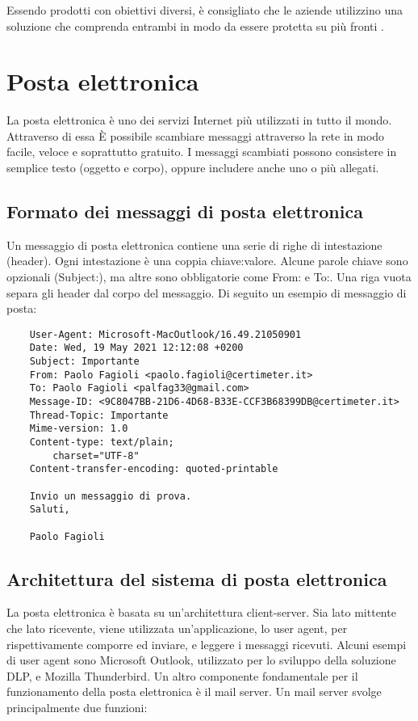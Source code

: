     \subsubsection*{}     
    Essendo prodotti con obiettivi diversi, è consigliato che le aziende utilizzino una soluzione che comprenda entrambi
    in modo da essere protetta su più fronti \cite{DLP5}.


\pagebreak
\section{Posta elettronica}
La posta elettronica è uno dei servizi Internet più utilizzati in tutto il mondo\cite{posta}. Attraverso di essa
È possibile scambiare messaggi attraverso la rete in modo facile, veloce e soprattutto gratuito. 
I messaggi scambiati possono consistere in semplice testo (oggetto e corpo), 
oppure includere anche uno o più allegati.

\subsection{Formato dei messaggi di posta elettronica}
Un messaggio di posta elettronica contiene una serie di righe di intestazione (header).
Ogni intestazione è una coppia chiave:valore. Alcune parole chiave sono opzionali (Subject:), 
ma altre sono obbligatorie come From: e To:. Una riga vuota separa gli header dal corpo del messaggio.
Di seguito un esempio di messaggio di posta:

\begin{verbatim}
    User-Agent: Microsoft-MacOutlook/16.49.21050901
    Date: Wed, 19 May 2021 12:12:08 +0200
    Subject: Importante
    From: Paolo Fagioli <paolo.fagioli@certimeter.it>
    To: Paolo Fagioli <palfag33@gmail.com>
    Message-ID: <9C8047BB-21D6-4D68-B33E-CCF3B68399DB@certimeter.it>
    Thread-Topic: Importante
    Mime-version: 1.0
    Content-type: text/plain;
        charset="UTF-8"
    Content-transfer-encoding: quoted-printable

    Invio un messaggio di prova.
    Saluti,

    Paolo Fagioli
\end{verbatim}

\subsection{Architettura del sistema di posta elettronica}
La posta elettronica è basata su un'architettura client-server. 
Sia lato mittente che lato ricevente, viene utilizzata un'applicazione, lo user agent, per rispettivamente 
comporre ed inviare, e leggere i messaggi ricevuti. 
Alcuni esempi di user agent sono Microsoft Outlook, utilizzato per lo sviluppo della soluzione DLP, 
e Mozilla Thunderbird.
Un altro componente fondamentale per il funzionamento della posta elettronica è il mail server. 
Un mail server svolge principalmente due funzioni:

